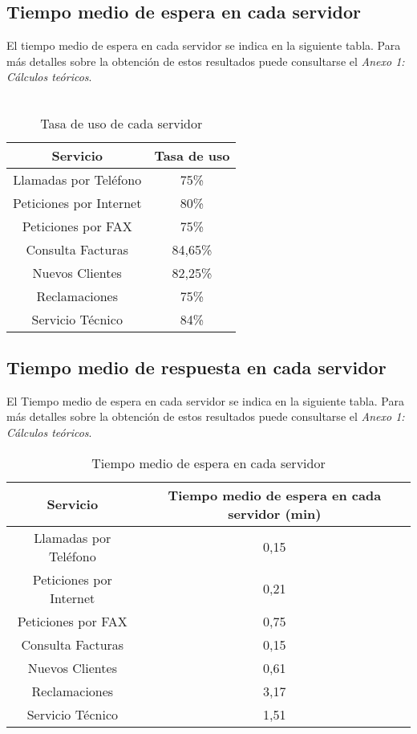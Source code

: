 \subsection{Tiempo medio de espera en cada servidor}
El tiempo medio de espera en cada servidor se indica en la siguiente tabla. Para más detalles sobre la obtención de estos resultados puede consultarse el \textit{Anexo 1: Cálculos teóricos}.\\
\\
\begin{table}[H]
  \begin{center}
  \begin{tabular}{|c|c|}
    \hline
    \textbf{Servicio}       & \textbf{Tasa de uso} \\ \hline
    Llamadas por Teléfono   & 75\%                   \\ \hline
    Peticiones por Internet & 80\%                  \\ \hline
    Peticiones por FAX      & 75\%                   \\ \hline
    Consulta Facturas      & 84,65\%                   \\ \hline
    Nuevos Clientes      & 82,25\%                   \\ \hline
    Reclamaciones      & 75\%                   \\ \hline
    Servicio Técnico      & 84\%                  \\ \hline
  \end{tabular}
\end{center}
  \caption{Tasa de uso de cada servidor}
  \end{table}
\subsection{Tiempo medio de respuesta en cada servidor}
El Tiempo medio de espera en cada servidor se indica en la siguiente tabla. Para más detalles sobre la obtención de estos resultados puede consultarse el \textit{Anexo 1: Cálculos teóricos}.\\
\begin{table}[H]
  \begin{center}
  \begin{tabular}{|c|c|}
    \hline
    \textbf{Servicio}       & \textbf{Tiempo medio de espera en cada servidor (min)} \\ \hline
    Llamadas por Teléfono   & 0,15                   \\ \hline
    Peticiones por Internet & 0,21                  \\ \hline
    Peticiones por FAX      & 0,75                   \\ \hline
    Consulta Facturas      & 0,15                   \\ \hline
    Nuevos Clientes      & 0,61                   \\ \hline
    Reclamaciones      & 3,17                   \\ \hline
    Servicio Técnico      & 1,51                   \\ \hline
  \end{tabular}
\end{center}
  \caption{Tiempo medio de espera en cada servidor}
  \end{table}